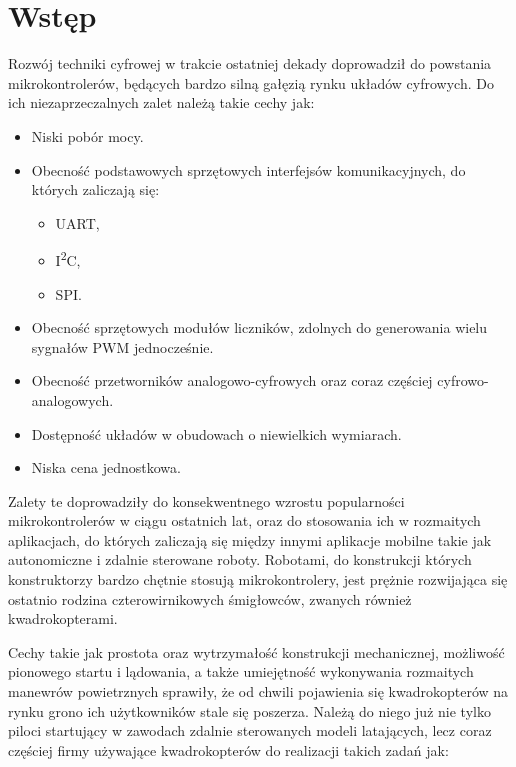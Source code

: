 
\chapter{Wstęp} %

\label{Chapter1} %


Rozwój techniki cyfrowej w trakcie ostatniej dekady doprowadził do powstania mikrokontrolerów, będących bardzo silną gałęzią rynku układów cyfrowych. Do ich niezaprzeczalnych zalet należą takie cechy jak:

\begin{itemize}
	\item Niski pobór mocy.
	\item Obecność podstawowych sprzętowych interfejsów komunikacyjnych, do których zaliczają się:
		\begin{itemize}
			\item UART,
			\item I\textsuperscript{2}C,
			\item SPI.
		\end{itemize}
	\item Obecność sprzętowych modułów liczników, zdolnych do generowania wielu sygnałów PWM jednocześnie.
	\item Obecność przetworników analogowo-cyfrowych oraz coraz częściej cyfrowo-analogowych.
	\item Dostępność układów w obudowach o niewielkich wymiarach.
	\item Niska cena jednostkowa.
\end{itemize}

Zalety te doprowadziły do konsekwentnego wzrostu popularności mikrokontrolerów w ciągu ostatnich lat, oraz do stosowania ich w rozmaitych aplikacjach, do których zaliczają się między innymi aplikacje mobilne takie jak autonomiczne i zdalnie sterowane roboty.
Robotami, do konstrukcji których konstruktorzy bardzo chętnie stosują mikrokontrolery, jest prężnie rozwijająca się ostatnio rodzina czterowirnikowych śmigłowców, zwanych również kwadrokopterami. 

Cechy takie jak prostota oraz wytrzymałość konstrukcji mechanicznej, możliwość pionowego startu i lądowania, a także umiejętność wykonywania rozmaitych manewrów powietrznych sprawiły, że od chwili pojawienia się kwadrokopterów na rynku grono ich użytkowników stale się poszerza.
Należą do niego już nie tylko piloci startujący w zawodach zdalnie sterowanych modeli latających, lecz coraz częściej firmy używające kwadrokopterów do realizacji takich zadań jak:


